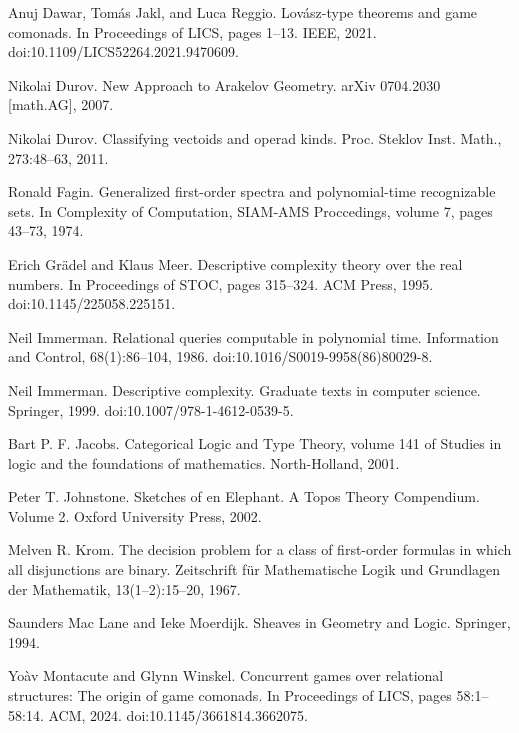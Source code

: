 \par\noindent  [11]  Anuj Dawar, Tomás Jakl, and Luca Reggio.  Lovász-type theorems and game comonads.  In Proceedings of LICS, pages 1–13. IEEE, 2021.  doi:10.1109/LICS52264.2021.9470609.  
 
\par\noindent  [12]  Nikolai Durov.  New Approach to Arakelov Geometry.  arXiv 0704.2030 [math.AG], 2007.  
 
\par\noindent  [13]  Nikolai Durov.  Classifying vectoids and operad kinds.  Proc. Steklov Inst. Math., 273:48–63, 2011.  
 
\par\noindent  [14]  Ronald Fagin.  Generalized first-order spectra and polynomial-time recognizable sets.  In Complexity of Computation, SIAM-AMS Proccedings, volume 7, pages 43–73, 1974.  
 
\par\noindent  [15]  Erich Grädel and Klaus Meer.  Descriptive complexity theory over the real numbers.  In Proceedings of STOC, pages 315–324. ACM Press, 1995.  doi:10.1145/225058.225151.  
 
\par\noindent  [16]  Neil Immerman.  Relational queries computable in polynomial time.  Information and Control, 68(1):86–104, 1986.  doi:10.1016/S0019-9958(86)80029-8.  
 
\par\noindent  [17]  Neil Immerman.  Descriptive complexity.  Graduate texts in computer science. Springer, 1999.  doi:10.1007/978-1-4612-0539-5.  
 
\par\noindent  [18]  Bart P. F. Jacobs.  Categorical Logic and Type Theory, volume 141 of Studies in logic and the foundations of mathematics.  North-Holland, 2001.  
 
\par\noindent  [19]  Peter T. Johnstone.  Sketches of en Elephant. A Topos Theory Compendium. Volume 2.  Oxford University Press, 2002.  
 
\par\noindent  [20]  Melven R. Krom.  The decision problem for a class of first-order formulas in which all disjunctions are binary.  Zeitschrift für Mathematische Logik und Grundlagen der Mathematik, 13(1–2):15–20, 1967.  
 
\par\noindent  [21]  Saunders Mac Lane and Ieke Moerdijk.  Sheaves in Geometry and Logic.  Springer, 1994.  
 
\par\noindent  [22]  Yoàv Montacute and Glynn Winskel.  Concurrent games over relational structures: The origin of game comonads.  In Proceedings of LICS, pages 58:1–58:14. ACM, 2024.  doi:10.1145/3661814.3662075.  
  
